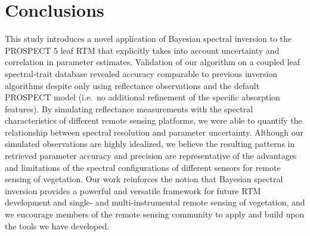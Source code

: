 \section{Conclusions}\label{sec:pecanrtm-conclusions}

This study introduces a novel application of Bayesian spectral inversion to the PROSPECT 5 leaf RTM that explicitly takes into account uncertainty and correlation in parameter estimates.
Validation of our algorithm on a coupled leaf spectral-trait database revealed accuracy comparable to previous inversion algorithms despite only using reflectance observations and the default PROSPECT model (i.e.\ no additional refinement of the specific absorption features).
By simulating reflectance measurements with the spectral characteristics of different remote sensing platforms, we were able to quantify the relationship between spectral resolution and parameter uncertainty.
Although our simulated observations are highly idealized, we believe the resulting patterns in retrieved parameter accuracy and precision are representative of the advantages and limitations of the spectral configurations of different sensors for remote sensing of vegetation.
Our work reinforces the notion that Bayesian spectral inversion provides a powerful and versatile framework for future RTM development and single- and multi-instrumental remote sensing of vegetation, and we encourage members of the remote sensing community to apply and build upon the tools we have developed.
